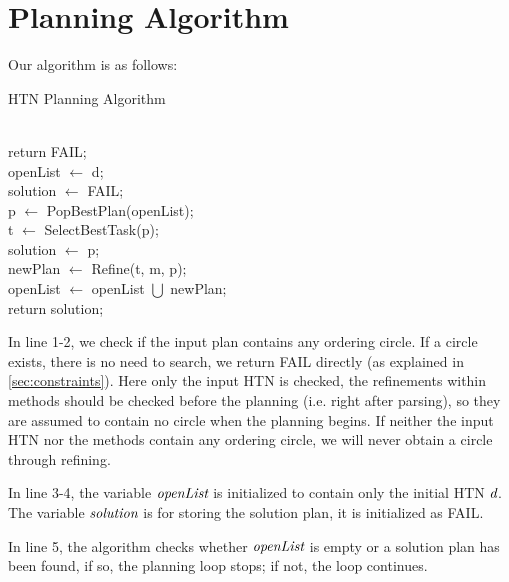 \section{Planning Algorithm}
Our algorithm is as follows:

\begin{algorithm}[H] 
\caption{HTN Planning Algorithm}
\label{algo1}
\\[0.2cm]
 { 
	return FAIL;
}\\[0.2cm]

openList $\leftarrow$ d;\\
solution $\leftarrow$ FAIL;\\[0.2cm]

 {
	p $\leftarrow$ PopBestPlan(openList);\\
	t $\leftarrow$ SelectBestTask(p);\\[0.2cm]

	 { 
		solution $\leftarrow$ p;
	}\\[0.2cm]

	 {
		{
			newPlan $\leftarrow$ Refine(t, m, p);\\
			openList $\leftarrow$ openList $\bigcup$ newPlan;
		}
	}
}\\[0.2cm]

return solution;
\end{algorithm}

In line 1-2, we check if the input plan contains any ordering circle. If a circle exists, there is no need to search, we return FAIL directly (as explained in \autoref{sec:constraints}). Here only the input HTN is checked, the refinements within methods should be checked before the planning (i.e. right after parsing), so they are assumed to contain no circle when the planning begins. If neither the input HTN nor the methods contain any ordering circle, we will never obtain a circle through refining.

In line 3-4, the variable $\emph{openList}$ is initialized to contain only the initial HTN $\emph{d}$. The variable $\emph{solution}$ is for storing the solution plan, it is initialized as FAIL.

In line 5, the algorithm checks whether $\emph{openList}$ is empty or a solution plan has been found, if so, the planning loop stops; if not, the loop continues.

